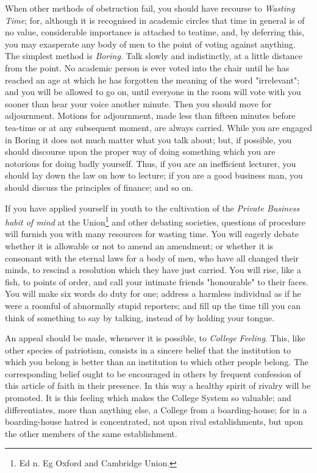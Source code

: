 \documentclass[12pt, oneside, b5paper]{memoir}
\begin{document}
When other methods of obstruction fail, you should have recourse to \emph{Wasting Time}; for, although it is recognised in academic circles that time in general is of no value, considerable importance is attached to teatime, and, by deferring this, you may exasperate any body of men to the point of voting against anything. The simplest method is \emph{Boring}. Talk slowly and indistinctly, at a little distance from the point. No academic person is ever voted into the chair until he has reached an age at which he has forgotten the meaning of the word "irrelevant"; and you will be allowed to go on, until everyone in the room will vote with you sooner than hear your voice another minute. Then you should move for adjournment. Motions for adjournment, made less than fifteen minutes before tea-time or at any subsequent moment, are always carried. While you are engaged in Boring it does not much matter what you talk about; but, if possible, you should discourse upon the proper way of doing something which you are notorious for doing badly yourself. Thus, if you are an inefficient lecturer, you should lay down the law on how to lecture; if you are a good business man, you should discuss the principles of finance; and so on.

If you have applied yourself in youth to the cultivation of the \emph{Private Business habit of mind} at the Union\footnote{Ed n. Eg Oxford and Cambridge Union.} and other debating societies, questions of procedure will furnish you with many resources for wasting time. You will eagerly debate whether it is allowable or not to amend an amendment; or whether it is consonant with the eternal laws for a body of men, who have all changed their minds, to rescind a resolution which they have just carried. You will rise, like a fish, to points of order, and call your intimate friends "honourable" to their faces. You will make six words do duty for one; address a harmless individual as if he were a roomful of abnormally stupid reporters; and fill up the time till you can think of something to say by talking, instead of by holding your tongue. 

An appeal should be made, whenever it is possible, to \emph{College Feeling}. This, like other species of patriotism, consists in a sincere belief that the institution to which you belong is better than an institution to which other people belong. The corresponding belief ought to be encouraged in others by frequent confession of this article of faith in their presence. In this way a healthy spirit of rivalry will be promoted. It is this feeling which makes the College System so valuable; and differentiates, more than anything else, a College from a boarding-house; for in a boarding-house hatred is concentrated, not upon rival establishments, but upon the other members of the same establishment.
\end{document}
